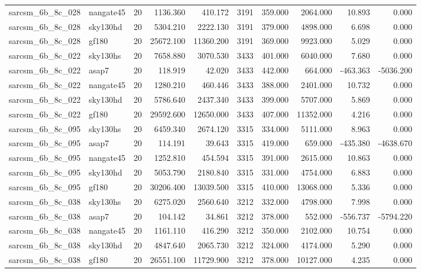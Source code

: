 \begin{longtable}{llrrrrrrrr}
sarcsm\_6b\_8c\_028 & nangate45 & 20 & 1136.360 & 410.172 & 3191 & 359.000 & 2064.000 & 10.893 & 0.000 \\
sarcsm\_6b\_8c\_028 & sky130hd & 20 & 5304.210 & 2222.130 & 3191 & 379.000 & 4898.000 & 6.698 & 0.000 \\
sarcsm\_6b\_8c\_028 & gf180 & 20 & 25672.100 & 11360.200 & 3191 & 369.000 & 9923.000 & 5.029 & 0.000 \\
sarcsm\_6b\_8c\_022 & sky130hs & 20 & 7658.880 & 3070.530 & 3433 & 401.000 & 6040.000 & 7.680 & 0.000 \\
sarcsm\_6b\_8c\_022 & asap7 & 20 & 118.919 & 42.020 & 3433 & 442.000 & 664.000 & -463.363 & -5036.200 \\
sarcsm\_6b\_8c\_022 & nangate45 & 20 & 1280.210 & 460.446 & 3433 & 388.000 & 2401.000 & 10.732 & 0.000 \\
sarcsm\_6b\_8c\_022 & sky130hd & 20 & 5786.640 & 2437.340 & 3433 & 399.000 & 5707.000 & 5.869 & 0.000 \\
sarcsm\_6b\_8c\_022 & gf180 & 20 & 29592.600 & 12650.000 & 3433 & 407.000 & 11352.000 & 4.216 & 0.000 \\
sarcsm\_6b\_8c\_095 & sky130hs & 20 & 6459.340 & 2674.120 & 3315 & 334.000 & 5111.000 & 8.963 & 0.000 \\
sarcsm\_6b\_8c\_095 & asap7 & 20 & 114.191 & 39.643 & 3315 & 419.000 & 659.000 & -435.380 & -4638.670 \\
sarcsm\_6b\_8c\_095 & nangate45 & 20 & 1252.810 & 454.594 & 3315 & 391.000 & 2615.000 & 10.863 & 0.000 \\
sarcsm\_6b\_8c\_095 & sky130hd & 20 & 5053.790 & 2180.840 & 3315 & 331.000 & 4754.000 & 6.883 & 0.000 \\
sarcsm\_6b\_8c\_095 & gf180 & 20 & 30206.400 & 13039.500 & 3315 & 410.000 & 13068.000 & 5.336 & 0.000 \\
sarcsm\_6b\_8c\_038 & sky130hs & 20 & 6275.020 & 2560.640 & 3212 & 332.000 & 4798.000 & 7.998 & 0.000 \\
sarcsm\_6b\_8c\_038 & asap7 & 20 & 104.142 & 34.861 & 3212 & 378.000 & 552.000 & -556.737 & -5794.220 \\
sarcsm\_6b\_8c\_038 & nangate45 & 20 & 1161.110 & 416.290 & 3212 & 350.000 & 2102.000 & 10.754 & 0.000 \\
sarcsm\_6b\_8c\_038 & sky130hd & 20 & 4847.640 & 2065.730 & 3212 & 324.000 & 4174.000 & 5.290 & 0.000 \\
sarcsm\_6b\_8c\_038 & gf180 & 20 & 26551.100 & 11729.900 & 3212 & 378.000 & 10127.000 & 4.235 & 0.000 \\

\end{longtable}
